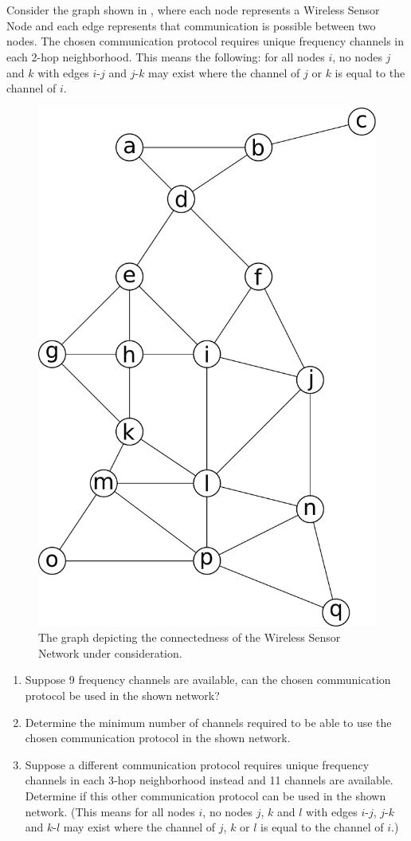 \chapter{}\label{chp:4}
{\color{gray} Consider the graph shown in , where each node represents a Wireless Sensor Node and each edge represents that communication is possible between two nodes. The chosen communication protocol requires unique frequency channels in each 2-hop neighborhood. This means the following: for all nodes $i$, no nodes $j$ and $k$ with edges $i$-$j$ and $j$-$k$ may exist where the channel of $j$ or $k$ is equal to the channel of $i$.}

\begin{figure}[H]
    \centering
    \includegraphics[width=0.7\columnwidth]{8/graph.pdf}
    \caption{{\color{gray} The graph depicting the connectedness of the Wireless Sensor Network under consideration.}}
    \label{fig:8}
\end{figure}

\renewcommand{\labelenumi}{(\alph{enumi})}
\begin{enumerate}
  \item {\color{gray} Suppose 9 frequency channels are available, can the chosen communication protocol be used in the shown network?}
  \item {\color{gray} Determine the minimum number of channels required to be able to use the chosen communication protocol in the shown network.}
  \item {\color{gray} Suppose a different communication protocol requires unique frequency channels in each 3-hop neighborhood instead and 11 channels are available. Determine if this other communication protocol can be used in the shown network. (This means for all nodes $i$, no nodes $j$, $k$ and $l$ with edges $i$-$j$, $j$-$k$ and $k$-$l$ may exist where the channel of $j$, $k$ or $l$ is equal to the channel of $i$.)}
\end{enumerate}

